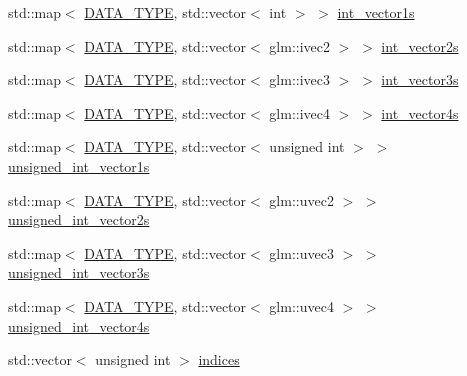 \begin{DoxyCompactItemize}
\item 
std\+::map$<$ \hyperlink{class_graphics_1_1_vertex_data_a50e88236939dc2a3ec4df7aeb728620e}{D\+A\+T\+A\+\_\+\+T\+Y\+P\+E}, std\+::vector$<$ int $>$ $>$ \hyperlink{class_graphics_1_1_vertex_data_a9d162343dbfbfec79b69e2f0b5658b23}{int\+\_\+vector1s}
\item 
std\+::map$<$ \hyperlink{class_graphics_1_1_vertex_data_a50e88236939dc2a3ec4df7aeb728620e}{D\+A\+T\+A\+\_\+\+T\+Y\+P\+E}, std\+::vector$<$ glm\+::ivec2 $>$ $>$ \hyperlink{class_graphics_1_1_vertex_data_a2cefac20aaef5f2d926db3cf493ca607}{int\+\_\+vector2s}
\item 
std\+::map$<$ \hyperlink{class_graphics_1_1_vertex_data_a50e88236939dc2a3ec4df7aeb728620e}{D\+A\+T\+A\+\_\+\+T\+Y\+P\+E}, std\+::vector$<$ glm\+::ivec3 $>$ $>$ \hyperlink{class_graphics_1_1_vertex_data_a7bac97fce5e77e7850a5b4562a08ec0f}{int\+\_\+vector3s}
\item 
std\+::map$<$ \hyperlink{class_graphics_1_1_vertex_data_a50e88236939dc2a3ec4df7aeb728620e}{D\+A\+T\+A\+\_\+\+T\+Y\+P\+E}, std\+::vector$<$ glm\+::ivec4 $>$ $>$ \hyperlink{class_graphics_1_1_vertex_data_a40c1de9342a843c0e7a3d885d55f10f4}{int\+\_\+vector4s}
\item 
std\+::map$<$ \hyperlink{class_graphics_1_1_vertex_data_a50e88236939dc2a3ec4df7aeb728620e}{D\+A\+T\+A\+\_\+\+T\+Y\+P\+E}, std\+::vector$<$ unsigned int $>$ $>$ \hyperlink{class_graphics_1_1_vertex_data_abd5405c2b07bc0b93cf6fc05b2c5ce0c}{unsigned\+\_\+int\+\_\+vector1s}
\item 
std\+::map$<$ \hyperlink{class_graphics_1_1_vertex_data_a50e88236939dc2a3ec4df7aeb728620e}{D\+A\+T\+A\+\_\+\+T\+Y\+P\+E}, std\+::vector$<$ glm\+::uvec2 $>$ $>$ \hyperlink{class_graphics_1_1_vertex_data_a7c1edb826a504590a160d8a6d7ab9ae8}{unsigned\+\_\+int\+\_\+vector2s}
\item 
std\+::map$<$ \hyperlink{class_graphics_1_1_vertex_data_a50e88236939dc2a3ec4df7aeb728620e}{D\+A\+T\+A\+\_\+\+T\+Y\+P\+E}, std\+::vector$<$ glm\+::uvec3 $>$ $>$ \hyperlink{class_graphics_1_1_vertex_data_abe783ff7cc5377bef16e9962c64287a9}{unsigned\+\_\+int\+\_\+vector3s}
\item 
std\+::map$<$ \hyperlink{class_graphics_1_1_vertex_data_a50e88236939dc2a3ec4df7aeb728620e}{D\+A\+T\+A\+\_\+\+T\+Y\+P\+E}, std\+::vector$<$ glm\+::uvec4 $>$ $>$ \hyperlink{class_graphics_1_1_vertex_data_ac2a440c02a321387efa2d0028c151655}{unsigned\+\_\+int\+\_\+vector4s}
\item 
std\+::vector$<$ unsigned int $>$ \hyperlink{class_graphics_1_1_vertex_data_a9b777aa4bf035e805b2957fbcd158842}{indices}

\end{DoxyCompactItemize}
